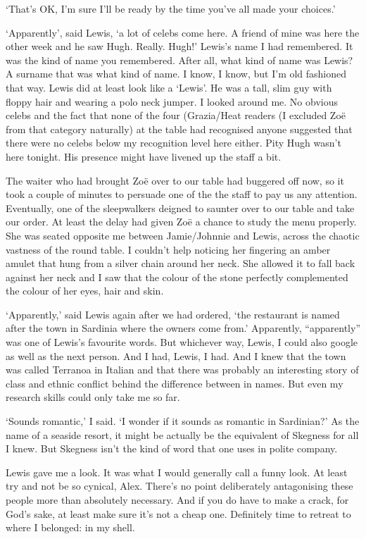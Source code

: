 `That's OK, I'm sure I'll be ready by the time you've all made your
choices.'

`Apparently', said Lewis, `a lot of celebs come here. A friend of mine was here the other week and he saw
Hugh. Really. Hugh!' Lewis's name I had remembered. It was the kind
of name you remembered. After all, what kind of name was Lewis? A
surname that was what kind of name. I know, I know, but I'm old
fashioned that way. Lewis did at least look like a `Lewis'. He was a
tall, slim guy with floppy hair and wearing a polo neck jumper. I
looked around me. No obvious celebs and the fact that none of the
four ({\twelvesl Grazia}/{\twelvesl Heat\/} readers (I excluded
Zoë from that category naturally) at the table had recognised
anyone suggested that there were no celebs below my recognition
level here either. Pity Hugh wasn't here tonight. His presence might
have livened up the staff a bit.

The waiter who had brought Zoë over to our table had buggered
off now, so it took a couple of minutes to persuade one of the the
staff to pay us any attention. Eventually, one of the sleepwalkers deigned to saunter over to our
table and take our order. At least the delay had given Zoë a
chance to study the menu properly. She was seated opposite me between Jamie/Johnnie and Lewis, across the chaotic vastness of the round table. I couldn't help noticing her fingering an
amber amulet that hung from a silver chain around her neck. She
allowed it to fall back against her neck and I saw
that the colour of the stone perfectly complemented the colour of her eyes, hair and
skin.

`Apparently,' said Lewis again after we had ordered, `the restaurant
is named after the town in Sardinia where the owners come from.'
Apparently, ``apparently'' was one of Lewis's favourite words. But
whichever way, Lewis, I could also google as well as the next
person. And I had, Lewis, I had. And I knew that the town was called
Terranoa in Italian and that there was probably an interesting story of class and ethnic conflict behind the difference between in names. But even my research skills
could only take me so far.

`Sounds romantic,' I said. `I wonder if it sounds as romantic in
Sardinian?' As the name of a seaside resort, it might be actually be the equivalent of Skegness for
all I knew. But Skegness isn't the kind of word that one uses in
polite company.

Lewis gave me a look. It was what I would generally call a funny
look. At least try and not be so cynical, Alex.
There's no point {\twelveit deliberately\/} antagonising these
people more than absolutely necessary. And if you do have to make a
crack, for God's sake, at least make sure it's not a cheap one.
Definitely time to retreat to where I belonged: in my shell.

